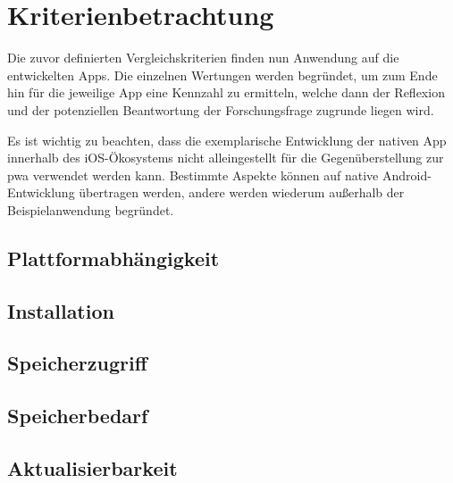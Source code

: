 
\section{Kriterienbetrachtung}

Die zuvor definierten Vergleichskriterien finden nun Anwendung auf die entwickelten Apps. Die einzelnen Wertungen werden begründet, um zum Ende hin für die jeweilige App eine Kennzahl zu ermitteln, welche dann der Reflexion und der potenziellen Beantwortung der Forschungsfrage zugrunde liegen wird.

Es ist wichtig zu beachten, dass die exemplarische Entwicklung der nativen App innerhalb des iOS-Ökosystems nicht alleingestellt für die Gegenüberstellung zur \ac{pwa} verwendet werden kann. Bestimmte Aspekte können auf native Android-Entwicklung übertragen werden, andere werden wiederum außerhalb der Beispielanwendung begründet.

\subsection{Plattformabhängigkeit} \label{sec:6-plattform}



\subsection{Installation} \label{sec:6-installation}


\subsection{Speicherzugriff} \label{sec:6-speicherzugriff}


\subsection{Speicherbedarf} \label{sec:6-speicherbedarf}


\subsection{Aktualisierbarkeit} \label{sec:6-aktualisierbarkeit}


